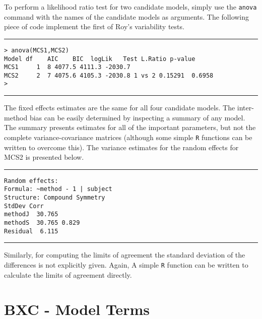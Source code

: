 \documentclass[12pt, a4paper]{report}
\theoremstyle{plain}
\theoremstyle{definition}
\theoremstyle{remark}
\begin{document}
To perform a likelihood ratio test for two candidate models, simply use the \texttt{anova} command with the names of the candidate models as arguments. The following piece of code implement the first of Roy's variability tests.
\\
\hrule
\begin{verbatim}
> anova(MCS1,MCS2)
Model df    AIC    BIC  logLik   Test L.Ratio p-value
MCS1     1  8 4077.5 4111.3 -2030.7
MCS2     2  7 4075.6 4105.3 -2030.8 1 vs 2 0.15291  0.6958
>
\end{verbatim}
\hrule
\vspace{1cm}
The fixed effects estimates are the same for all four candidate models. The inter-method bias can be easily determined by inspecting a summary of any model. The summary presents estimates for all of the important parameters, but not the complete variance-covariance matrices (although some simple \texttt{R} functions can be written to overcome this). The variance estimates for the random effects for MCS2 is presented below.
\\
\hrule
\begin{verbatim}
Random effects:
Formula: ~method - 1 | subject
Structure: Compound Symmetry
StdDev Corr
methodJ  30.765
methodS  30.765 0.829
Residual  6.115
\end{verbatim}
\hrule
\vspace{1cm}
Similarly, for computing the limits of agreement the standard deviation of the differences is not explicitly given. Again, A simple \texttt{R} function can be written to calculate the limits of agreement directly.


\section{BXC - Model Terms}
\end{document}
